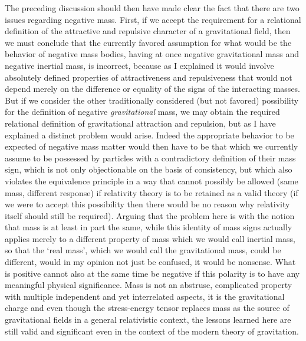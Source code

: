\documentclass[notitlepage,12pt]{report}
\begin{document}
The preceding discussion should then have made clear the fact that there are two issues regarding negative mass. First, if we accept the requirement for a relational definition of the attractive and repulsive character of a gravitational field, then we must conclude that the currently favored assumption for what would be the behavior of negative mass bodies, having at once negative gravitational mass and negative inertial mass, is incorrect, because as I explained it would involve absolutely defined properties of attractiveness and repulsiveness that would not depend merely on the difference or equality of the signs of the interacting masses. But if we consider the other traditionally considered (but not favored) possibility for the definition of negative \textit{gravitational} mass, we may obtain the required relational definition of gravitational attraction and repulsion, but as I have explained a distinct problem would arise. Indeed the appropriate behavior to be expected of negative mass matter would then have to be that which we currently assume to be possessed by particles with a contradictory definition of their mass sign, which is not only objectionable on the basis of consistency, but which also violates the equivalence principle in a way that cannot possibly be allowed (same mass, different response) if relativity theory is to be retained as a valid theory (if we were to accept this possibility then there would be no reason why relativity itself should still be required). Arguing that the problem here is with the notion that mass is at least in part the same, while this identity of mass signs actually applies merely to a different property of mass which we would call inertial mass, so that the `real mass', which we would call the gravitational mass, could be different, would in my opinion not just be confused, it would be nonsense. What is positive cannot also at the same time be negative if this polarity is to have any meaningful physical significance. Mass is not an abstruse, complicated property with multiple independent and yet interrelated aspects, it is the gravitational charge and even though the stress-energy tensor replaces mass as the source of gravitational fields in a general relativistic context, the lessons learned here are still valid and significant even in the context of the modern theory of gravitation.
\end{document}
